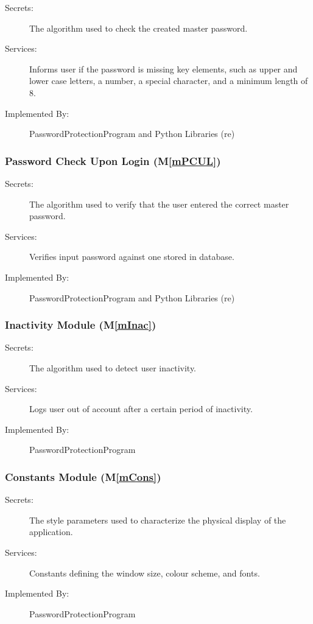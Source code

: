 \documentclass[12pt, titlepage]{article}
\newcommand{\mref}[1]{M\ref{#1}}
\begin{document}
\begin{description}
\item[Secrets:] The algorithm used to check the created master password.
\item[Services:] Informs user if the password is missing key elements, such as upper and lower case letters, a number, a special character, and a minimum length of 8.
\item[Implemented By:] PasswordProtectionProgram and Python Libraries (re)
\end{description}

\subsubsection{Password Check Upon Login (\mref{mPCUL})}

\begin{description}
\item[Secrets:] The algorithm used to verify that the user entered the correct master password.
\item[Services:] Verifies input password against one stored in database.
\item[Implemented By:] PasswordProtectionProgram and Python Libraries (re)
\end{description}

\subsubsection{Inactivity Module (\mref{mInac})}

\begin{description}
\item[Secrets:] The algorithm used to detect user inactivity.
\item[Services:] Logs user out of account after a certain period of inactivity.
\item[Implemented By:] PasswordProtectionProgram
\end{description}

\subsubsection{Constants Module (\mref{mCons})}

\begin{description}
\item[Secrets:] The style parameters used to characterize the physical display of the application.
\item[Services:] Constants defining the window size, colour scheme, and fonts.
\item[Implemented By:] PasswordProtectionProgram
\end{description}
\end{document}
